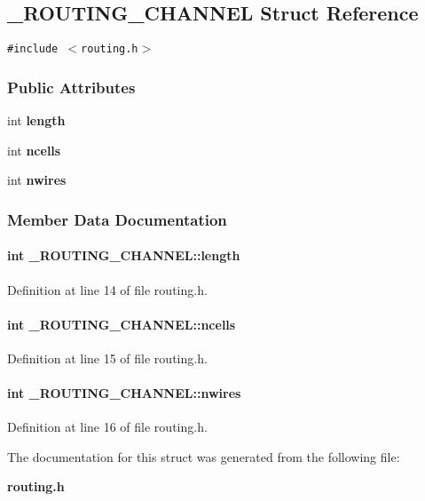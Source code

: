 \subsection{\_\-ROUTING\_\-CHANNEL  Struct Reference}
\label{_ROUTING_CHANNEL}
{\tt \#include $<$routing.h$>$}

\subsubsection*{Public Attributes}
\begin{CompactItemize}
\item 
int {\bf length}
\item 
int {\bf ncells}
\item 
int {\bf nwires}
\end{CompactItemize}


\subsubsection{Member Data Documentation}
\label{_ROUTING_CHANNEL_m0}
\paragraph{\setlength{\rightskip}{0pt plus 5cm}int \_\-ROUTING\_\-CHANNEL::length}\hfill



Definition at line 14 of file routing.h.\label{_ROUTING_CHANNEL_m1}
\paragraph{\setlength{\rightskip}{0pt plus 5cm}int \_\-ROUTING\_\-CHANNEL::ncells}\hfill



Definition at line 15 of file routing.h.\label{_ROUTING_CHANNEL_m2}
\paragraph{\setlength{\rightskip}{0pt plus 5cm}int \_\-ROUTING\_\-CHANNEL::nwires}\hfill



Definition at line 16 of file routing.h.

The documentation for this struct was generated from the following file:\begin{CompactItemize}
\item 
{\bf routing.h}\end{CompactItemize}
